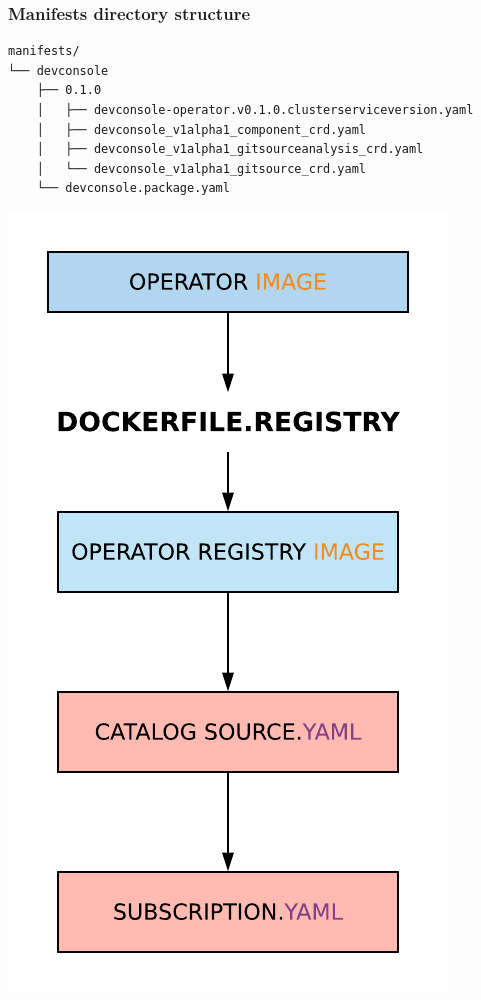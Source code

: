 \documentclass[aspectratio=169]{beamer}
\begin{document}
\begin{frame}[fragile]
  \frametitle{Manifests directory structure}

  \begin{Verbatim}[fontsize=\small]
manifests/
└── devconsole
    ├── 0.1.0
    │   ├── devconsole-operator.v0.1.0.clusterserviceversion.yaml
    │   ├── devconsole_v1alpha1_component_crd.yaml
    │   ├── devconsole_v1alpha1_gitsourceanalysis_crd.yaml
    │   └── devconsole_v1alpha1_gitsource_crd.yaml
    └── devconsole.package.yaml
  \end{Verbatim}

\end{frame}

\begin{frame}
  \begin{center}
    \includegraphics[scale=.50]{images/dockerfile.png}
  \end{center}
\end{frame}
\end{document}
